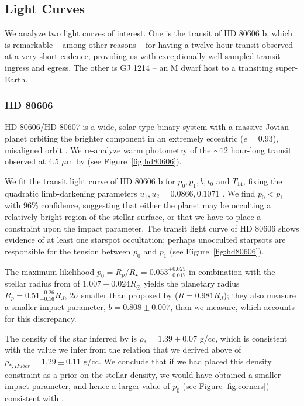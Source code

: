 \subsection{\spitzer Light Curves} \label{sec:spitzer}

We analyze two \spitzer light curves of interest. One is the transit of HD 80606 b, which is remarkable -- among other reasons -- for having a twelve hour transit observed at a very short cadence, providing us with exceptionally well-sampled transit ingress and egress. The other is GJ 1214 -- an M dwarf host to a transiting super-Earth.

\subsubsection{HD 80606}

HD 80606/HD 80607 is a wide, solar-type binary system with a massive Jovian planet orbiting the brighter component in an extremely eccentric ($e = 0.93$), misaligned orbit \citep{Naef2001, Moutou2009, Winn2009b}. We re-analyze warm \spitzer photometry of the $\sim 12$ hour-long transit observed at 4.5 $\mu$m by \citet{Hebrard2010} (see Figure~\ref{fig:hd80606}).

We fit the \spitzer transit light curve of HD 80606 b for $p_0, p_1, b, t_0$ and $T_{14}$, fixing the quadratic limb-darkening parameters $u_1, u_2=0.0866, 0.1071$ \citep{Claret2013}. We find $p_0 < p_1$ with 96\% confidence, suggesting that either the planet may be occulting a relatively bright region of the stellar surface, or that we have to place a constraint upon the impact parameter.  The transit light curve of HD 80606 shows evidence of at least one starspot occultation; perhaps  unocculted starpsots are responsible for the tension between $p_0$ and $p_1$ (see Figure~\ref{fig:hd80606}). 

The maximum likelihood $p_0 = R_p/R_\star =  0.053^{+0.025}_{-0.017}$ in combination with the stellar radius from \citet{Hebrard2010} of $1.007 \pm 0.024 R_\odot$ yields the planetary radius $R_p = 0.51_{-0.16}^{+0.26} R_J$, $2\sigma$ smaller than proposed by \citet{Hebrard2010} ($R= 0.981 R_J$);  they also measure a smaller impact parameter, $b=0.808 \pm 0.007$, than we measure, which accounts for this discrepancy.

The density of the star inferred by \citet{Hebrard2010} is $\rho_* = 1.39\pm 0.07$ g/cc, which is consistent
with the value we infer from the \citet{Huber2013} relation that we derived above of $\rho_{*,Huber} = 1.29 \pm 0.11$ g/cc.
We conclude that if we had placed this density constraint as a prior on the stellar density, we would have
obtained a smaller impact parameter, and hence a larger value of $p_0$ (see Figure \ref{fig:corners}) consistent
with \citet{Hebrard2010}.

